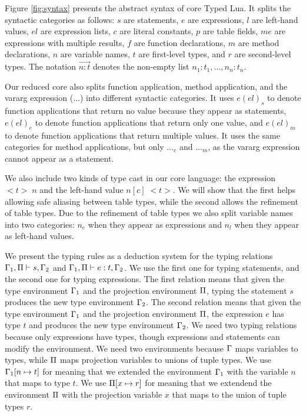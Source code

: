 Figure \ref{fig:syntax} presents the abstract syntax of core Typed Lua.
It splits the syntactic categories as follows:
$s$ are statements, $e$ are expressions, $l$ are left-hand values,
$el$ are expression lists, $c$ are literal constants, $p$ are table fields,
$me$ are expressions with multiple results, $f$ are function declarations,
$m$ are method declarations, $n$ are variable names,
$t$ are first-level types, and $r$ are second-level types.
The notation $\vec{n{:}t}$ denotes the non-empty list
$n_{1}{:}t_{1}, ..., n_{n}{:}t_{n}$.

Our reduced core also splits function application, method application, and
the vararg expression (${...}$) into different syntactic categories.
It uses $e(el)_{s}$ to denote function applications that return no value
because they appear as statements,
$e(el)_{e}$ to denote function applications that return only one value,
and $e(el)_{m}$ to denote function applications that return multiple values.
It uses the same categories for method applications, but only ${...}_{e}$
and ${...}_{m}$, as the vararg expression cannot appear as a statement.

We also include two kinds of type cast in our core language:
the expression ${<}t{>} \;n$ and the left-hand value $n[c] \; {<}t{>}$.
We will show that the first helps allowing safe aliasing between
table types, while the second allows the refinement of table types.
Due to the refinement of table types we also split variable names
into two categories: $n_{e}$ when they appear as expressions and
$n_{l}$ when they appear as left-hand values.

We present the typing rules as a deduction system for the typing
relations $\Gamma_{1}, \Pi \vdash s, \Gamma_{2}$ and
$\Gamma_{1}, \Pi \vdash e : t, \Gamma_{2}$.
We use the first one for typing statements, and the second one
for typing expressions.
The first relation means that given the type environment $\Gamma_{1}$
and the projection environment $\Pi$,
typing the statement $s$ produces the new type environment $\Gamma_{2}$.
The second relation means that given the type environment $\Gamma_{1}$
and the projection environment $\Pi$,
the expression $e$ has type $t$ and produces the new type environment $\Gamma_{2}$.
We need two typing relations because only expressions have types,
though expressions and statements can modify the environment.
We need two environments because $\Gamma$ maps variables to types,
while $\Pi$ maps projection variables to unions of tuple types.
We use $\Gamma_{1}[n \mapsto t]$ for meaning that we extended the environment
$\Gamma_{1}$ with the variable $n$ that maps to type $t$.
We use $\Pi[x \mapsto r]$ for meaning that we extendend the environment
$\Pi$ with the projection variable $x$ that maps to the union of tuple types $r$.

